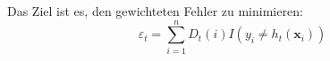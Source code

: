 Das Ziel ist es, den gewichteten Fehler zu minimieren:
$$
    \varepsilon_t = \sum_{i=1}^n {D}_t(i) I\left(y_i \neq h_t\left(\boldsymbol{x}_i\right)\right)
$$